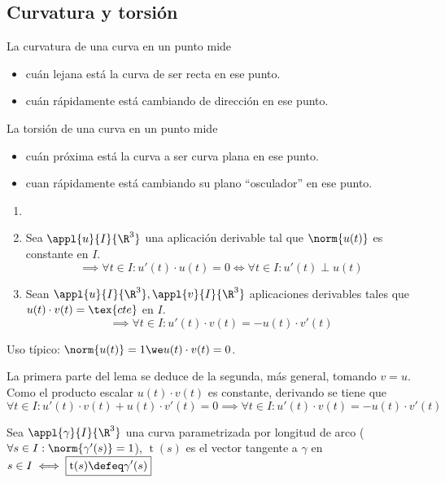 \documentclass[12pt]{article}
\newcommand{\tngnt}{\operatorname{t}}
\begin{document}
\subsection{Curvatura y torsión}
La curvatura de una curva en un punto mide
\begin{itemize}[topsep=1pt, itemsep=1pt,parsep=3pt]
	\item cuán lejana está la curva de ser recta en ese punto.
	\item cuán rápidamente está cambiando de dirección en ese punto.
\end{itemize}
La torsión de una curva en un punto mide
\begin{itemize}[topsep=1pt, itemsep=1pt,parsep=3pt]
	\item cuán próxima está la curva a ser curva plana en ese punto.
	\item cuan rápidamente está cambiando su plano “osculador” en ese punto.
\end{itemize}
\vspace{0.4cm}
\begin{lem}
	\begin{enumerate}[topsep=0pt, itemsep=1pt,parsep=3pt]
		\item[] 
		\item Sea $\appl{u}{I}{\R^3}$ una aplicación derivable tal que $\norm{u(t)}$ es constante en $I$.
		\[\implies \forall t \in I : u'(t)\cdot u(t)=0 \iff \forall t \in I : u'(t) \perp u(t)\]
		\item Sean $\appl{u}{I}{\R^3}, \appl{v}{I}{\R^3}$ aplicaciones derivables tales que $u(t)\cdot v(t)=\tex{cte}$ en $I$.
		\[\implies \forall t \in I : u'(t) \cdot v(t)=-u(t)\cdot v'(t)\]
	\end{enumerate}
	Uso típico: $\norm{u(t)}=1 \we u(t)\cdot v(t)=0$.
	\begin{dem}
		La primera parte del lema se deduce de la segunda, más general, tomando $v=u$.
		Como el producto escalar $u(t)\cdot v(t)$ es constante, derivando se tiene que
		\[\forall t \in I : u'(t)\cdot v(t) + u(t)\cdot v'(t) = 0 \implies \forall t \in I : u'(t)\cdot v(t) = - u(t)\cdot v'(t)\]
	\end{dem}
\end{lem}

\begin{defn}
	Sea $\appl{\gamma}{I}{\R^3}$ una curva parametrizada por longitud de arco ($\forall s \in I : \norm{\gamma'(s)}=1$), $\tngnt(s)$ es el vector tangente a $\gamma$ en $s\in I \iff \boxed{\tngnt(s)\defeq \gamma'(s)}$
\end{defn}
\end{document}
